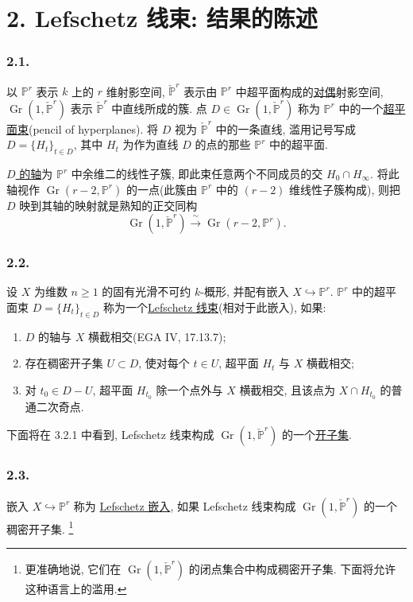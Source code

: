 \section*{2. Lefschetz 线束: 结果的陈述}

\subsubsection*{2.1.}
以 $\mathbb P^r$ 表示 $k$ 上的 $r$ 维射影空间, $\check{\mathbb P}^{r}$ 表示由 $\mathbb P^r$ 中超平面构成的\underline{对偶}射影空间, $\operatorname{Gr}(1,\check{\mathbb P}^{r})$ 表示 $\check{\mathbb P}^{r}$ 中直线所成的簇. 点 $D\in\operatorname{Gr}(1,\check{\mathbb P}^{r})$ 称为 $\mathbb P^r$ 中的一个\underline{超平面束}(pencil of hyperplanes). 将 $D$ 视为 $\check{\mathbb P}^{r}$ 中的一条直线, 滥用记号写成 $D=\{H_t\}_{t\in D}$, 其中 $H_t$ 为作为直线 $D$ 的点的那些 $\mathbb P^r$ 中的超平面.

\underline{$D$ 的轴}为 $\mathbb P^r$ 中余维二的线性子簇, 即此束任意两个不同成员的交 $H_0\cap H_\infty$. 将此轴视作 $\operatorname{Gr}(r-2,\mathbb P^r)$ 的一点(此簇由 $\mathbb P^r$ 中的 $(r-2)$ 维线性子簇构成), 则把 $D$ 映到其轴的映射就是熟知的正交同构
\[
\operatorname{Gr}(1,\check{\mathbb P}^{r})
\xrightarrow{\ \sim\ }
\operatorname{Gr}(r-2,\mathbb P^r).
\]

\subsubsection*{2.2.}
设 $X$ 为维数 $n\geq1$ 的固有光滑不可约 $k$-概形, 并配有嵌入 $X\hookrightarrow\mathbb P^r$. $\mathbb P^r$ 中的超平面束 $D=\{H_t\}_{t\in D}$ 称为一个\underline{Lefschetz 线束}(相对于此嵌入), 如果:
\begin{enumerate}
\item[(a)] $D$ 的轴与 $X$ 横截相交(EGA IV, 17.13.7);
\item[(b)] 存在稠密开子集 $U\subset D$, 使对每个 $t\in U$, 超平面 $H_t$ 与 $X$ 横截相交;
\item[(c)] 对 $t_0\in D-U$, 超平面 $H_{t_0}$ 除一个点外与 $X$ 横截相交, 且该点为 $X\cap H_{t_0}$ 的普通二次奇点.
\end{enumerate}
下面将在 3.2.1 中看到, Lefschetz 线束构成 $\operatorname{Gr}(1,\check{\mathbb P}^{r})$ 的一个\underline{开子集}.

\subsubsection*{2.3.}
嵌入 $X\hookrightarrow\mathbb P^r$ 称为 \underline{Lefschetz 嵌入}, 如果 Lefschetz 线束构成 $\operatorname{Gr}(1,\check{\mathbb P}^{r})$ 的一个稠密开子集.
\footnote{更准确地说, 它们在 $\operatorname{Gr}(1,\check{\mathbb P}^{r})$ 的闭点集合中构成稠密开子集. 下面将允许这种语言上的滥用.}

